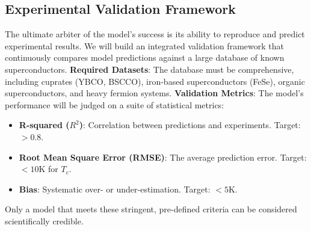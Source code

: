 \subsection{Experimental Validation Framework}
The ultimate arbiter of the model's success is its ability to reproduce and predict experimental results. We will build an integrated validation framework that continuously compares model predictions against a large database of known superconductors.
\textbf{Required Datasets}: The database must be comprehensive, including cuprates (YBCO, BSCCO), iron-based superconductors (FeSe), organic superconductors, and heavy fermion systems.
\textbf{Validation Metrics}: The model's performance will be judged on a suite of statistical metrics:
\begin{itemize}
    \item \textbf{R-squared ($R^2$)}: Correlation between predictions and experiments. Target: $> 0.8$.
    \item \textbf{Root Mean Square Error (RMSE)}: The average prediction error. Target: $< 10$K for $T_c$.
    \item \textbf{Bias}: Systematic over- or under-estimation. Target: $< 5$K.
\end{itemize}
Only a model that meets these stringent, pre-defined criteria can be considered scientifically credible.

